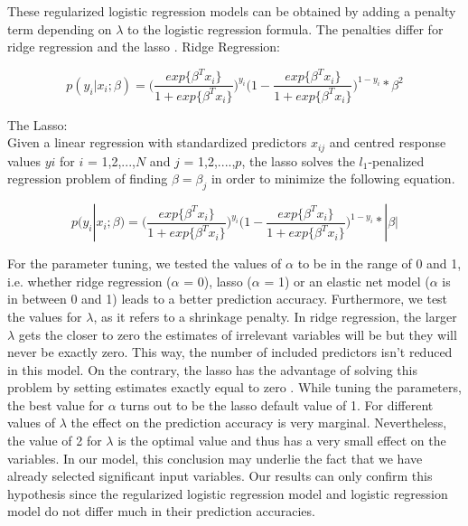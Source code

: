 \documentclass[12pt]{article}
\begin{document}
These regularized logistic regression models can be obtained by adding a penalty term depending on $\lambda$ to the logistic regression formula. The penalties differ for ridge regression and the lasso \cite{ogutu2012genomic}.
\noindent Ridge Regression: 
\begin{center}
	\begin{equation}
				p(y_i|x_i;\beta)=\Big(\frac{exp\{\beta^T x_i\}}{1+exp\{\beta^Tx_i\}}\Big)^{y_i}\Big(1-\frac{exp\{\beta^T x_i\}}{1+exp\{\beta^Tx_i\}}\Big)^{1-y_i} * \beta^2
	\end{equation}
\end{center}
\noindent The Lasso: \\
Given a linear regression with standardized predictors $x_{ij}$ and centred response values $yi$ for $i$ = 1,2,...,$N$ and $j$ = 1,2,....,$p$, the lasso solves the $l_1$-penalized regression problem of finding
$\beta ={\beta_j}$ in order to minimize the following equation.
\begin{center}
	\begin{equation}
				p(y_i|x_i;\beta)=\Big(\frac{exp\{\beta^T x_i\}}{1+exp\{\beta^Tx_i\}}\Big)^{y_i}\Big(1-\frac{exp\{\beta^T x_i\}}{1+exp\{\beta^Tx_i\}}\Big)^{1-y_i} * |\beta|
	\end{equation}
\end{center}
For the parameter tuning, we tested the values of $\alpha$ to be in the range of 0 and 1, i.e. whether ridge regression ($\alpha$ = 0), lasso ($\alpha$ = 1) or an elastic net model ($\alpha$ is in between 0 and 1) leads to a better prediction accuracy. Furthermore, we test the values for $\lambda$, as it refers to a shrinkage penalty. In ridge regression, the larger $\lambda$ gets the closer to zero the estimates of irrelevant variables will be but they will never be exactly zero. This way, the number of included predictors isn’t reduced in this model. On the contrary, the lasso has the advantage of solving this problem by setting estimates exactly equal to zero \cite{pereira2016logistic}. While tuning the parameters, the best value for $\alpha$ turns out to be the lasso default value of 1. For different values of $\lambda$ the effect on the prediction accuracy is very marginal. Nevertheless, the value of 2 for $\lambda$ is the optimal value and thus has a very small effect on the variables. In our model, this conclusion may underlie the fact that we have already selected significant input variables. Our results can only confirm this hypothesis since the regularized logistic regression model and logistic regression model do not differ much in their prediction accuracies.
\end{document}
